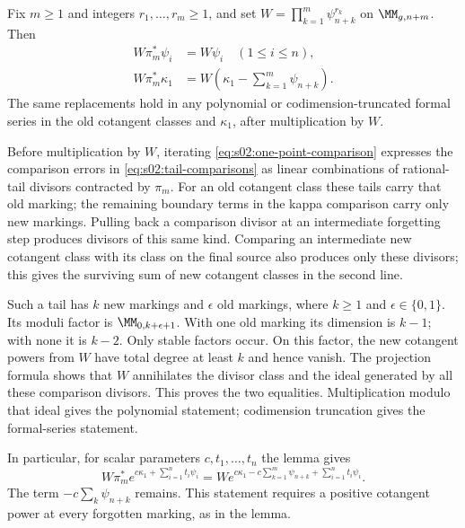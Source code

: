 \begin{lmm}
\label{lmm:s02:rational-tail-degree}
Fix $m\geq1$ and integers $r_1,\ldots,r_m\geq1$, and set
$W=\prod_{k=1}^m\psi_{n+k}^{r_k}$ on $\MM_{g,n+m}$.  Then
\begin{equation}
\label{eq:s02:tail-comparisons}
\begin{split}
W\pi_m^*\psi_i&=W\psi_i\quad(1\leq i\leq n),\\
W\pi_m^*\kappa_1
&=W\left(\kappa_1-\sum_{k=1}^m\psi_{n+k}\right).
\end{split}
\end{equation}
The same replacements hold in any polynomial or codimension-truncated
formal series in the old cotangent classes and $\kappa_1$, after
multiplication by $W$.
\end{lmm}

\begin{prf}
Before multiplication by $W$, iterating
\eqref{eq:s02:one-point-comparison} expresses the comparison errors
in \eqref{eq:s02:tail-comparisons} as linear combinations of
rational-tail divisors contracted by $\pi_m$.  For an old cotangent
class these tails carry that old marking; the remaining boundary
terms in the kappa comparison carry only new markings.  Pulling back a comparison
divisor at an intermediate forgetting step produces divisors of this
same kind.  Comparing an intermediate new cotangent class with its
class on the final source also produces only these divisors; this
gives the surviving sum of new cotangent classes in the second line.

Such a tail has $k$ new markings and $\epsilon$ old markings, where
$k\geq1$ and $\epsilon\in\{0,1\}$.  Its moduli factor is
$\MM_{0,k+\epsilon+1}$.  With one old marking its dimension is
$k-1$; with none it is $k-2$.  Only stable factors occur.  On this
factor, the new cotangent powers from $W$ have total degree at least
$k$ and hence vanish.  The projection formula shows that $W$
annihilates the divisor class and the ideal generated by all these
comparison divisors.  This proves the two equalities.  Multiplication
modulo that ideal gives the polynomial statement; codimension
truncation gives the formal-series statement.
\end{prf}

In particular, for scalar parameters $c,t_1,\ldots,t_n$ the lemma gives
\begin{equation}
\label{eq:s02:tail-exponential}
W\pi_m^*e^{c\kappa_1+\sum_{i=1}^nt_i\psi_i}
=W e^{c\kappa_1-c\sum_{k=1}^m\psi_{n+k}+\sum_{i=1}^nt_i\psi_i}.
\end{equation}
The term $-c\sum_k\psi_{n+k}$ remains.  This statement requires a
positive cotangent power at every forgotten marking, as in the lemma.

